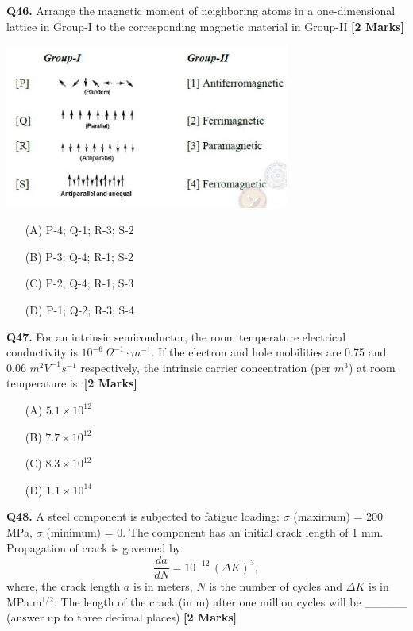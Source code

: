 \documentclass[11pt]{article}
\newcommand{\questionb}[2]{
    \noindent\textbf{Q#2.} #1 \hfill \textbf{[2 Marks]}
}
\begin{document}
\questionb{Arrange the magnetic moment of neighboring atoms in a one-dimensional lattice in Group-I to the corresponding magnetic material in Group-II}{46}
\begin{center}
\includegraphics[width=0.7\textwidth]{figures/46.png}
\end{center}
\begin{enumerate}
    \item[(A)] P-4; Q-1; R-3; S-2
    \item[(B)] P-3; Q-4; R-1; S-2
    \item[(C)] P-2; Q-4; R-1; S-3
    \item[(D)] P-1; Q-2; R-3; S-4
\end{enumerate}
\vspace{0.5cm}

\questionb{For an intrinsic semiconductor, the room temperature electrical conductivity is \(10^{-6} \, \Omega^{-1} \cdot m^{-1}\). If the electron and hole mobilities are 0.75 and 0.06 \(m^2V^{-1}s^{-1}\) respectively, the intrinsic carrier concentration (per \(m^3\)) at room temperature is:}{47}
\begin{enumerate}
    \item[(A)] \(5.1 \times 10^{12}\)
    \item[(B)] \(7.7 \times 10^{12}\)
    \item[(C)] \(8.3 \times 10^{12}\)
    \item[(D)] \(1.1 \times 10^{14}\)
\end{enumerate}
\vspace{0.5cm}

\questionb{A steel component is subjected to fatigue loading: \(\sigma\) (maximum) = 200 MPa, \(\sigma\) (minimum) = 0. The component has an initial crack length of 1 mm. Propagation of crack is governed by
\[\frac{da}{dN} = 10^{-12} \, (\Delta K)^3,\]
where, the crack length \(a\) is in meters, \(N\) is the number of cycles and \(\Delta K\) is in MPa.m\(^{1/2}\). The length of the crack (in m) after one million cycles will be \_\_\_\_\_ (answer up to three decimal places)}{48}
\vspace{0.5cm}
\end{document}
